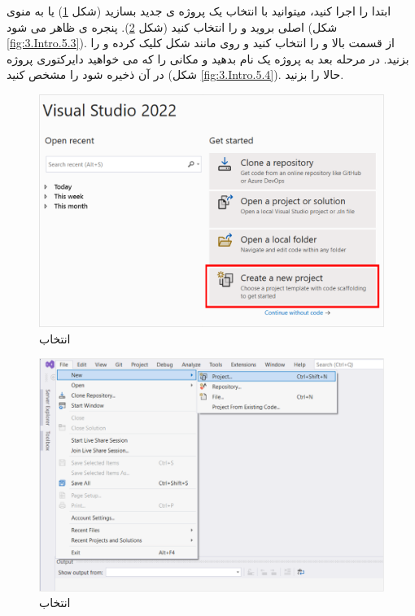 {
    \Large
    \begin{spacing}{1.5}
        ابتدا  را اجرا کنید، میتوانید با انتخاب  یک پروژه ی جدید بسازید (شکل \ref{fig:3.Intro.5.1}) یا به منوی اصلی بروید و  را انتخاب کنید (شکل \ref{fig:3.Intro.5.2}).
        پنجره ی  ظاهر می شود (شکل \ref{fig:3.Intro.5.3}).
        از قسمت بالا  و  را انتخاب کنید و روی  مانند شکل کلیک کرده و  را بزنید.
        در مرحله بعد به پروژه یک نام بدهید و مکانی را که می خواهید دایرکتوری پروژه در آن ذخیره شود را مشخص کنید (شکل \ref{fig:3.Intro.5.4}).
        حالا  را بزنید.

        \begin{figure}[H]
            \centering
            \setlength{\belowcaptionskip}{-10pt}
            \includegraphics[width=\textwidth]{Images/3/3.Intro.5.1}
            \caption{انتخاب }
            \label{fig:3.Intro.5.1}
        \end{figure}

        \begin{figure}[H]
            \centering
            \setlength{\belowcaptionskip}{-10pt}
            \includegraphics[width=\textwidth]{Images/3/3.Intro.5.2}
            \caption{انتخاب }
            \label{fig:3.Intro.5.2}
        \end{figure}


\end{spacing}}
